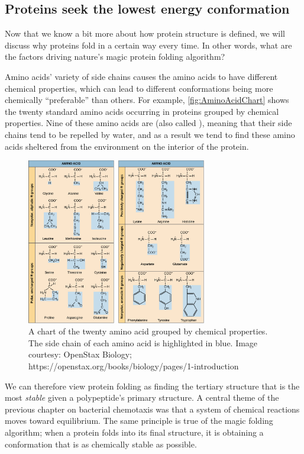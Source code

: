 \FloatBarrier
{}
\subsection{Proteins seek the lowest energy conformation}

Now that we know a bit more about how protein structure is defined, we will discuss why proteins fold in a certain way every time. In other words, what are the factors driving nature's magic protein folding algorithm?

Amino acids' variety of side chains causes the amino acids to have different chemical properties, which can lead to different conformations being more chemically ``preferable'' than others. For example, \autoref{fig:AminoAcidChart} shows the twenty standard amino acids occurring in proteins grouped by chemical properties. Nine of these amino acids are  (also called ), meaning that their side chains tend to be repelled by water, and as a result we tend to find these amino acids sheltered from the environment on the interior of the protein.

\begin{figure}[h]
	\centering
	\mySfFamily
	\includegraphics[width = 0.7\textwidth]{../images/AminoAcidChart.png}
	\caption{A chart of the twenty amino acid grouped by chemical properties. The side chain of each amino acid is highlighted in blue. Image courtesy: OpenStax Biology; https://openstax.org/books/biology/pages/1-introduction}
	\label{fig:AminoAcidChart}
\end{figure}

We can therefore view protein folding as finding the tertiary structure that is the most \textit{stable} given a polypeptide's primary structure. A central theme of the previous chapter on bacterial chemotaxis was that a system of chemical reactions moves toward equilibrium. The same principle is true of the magic folding algorithm; when a protein folds into its final structure, it is obtaining a conformation that is as chemically stable as possible.

